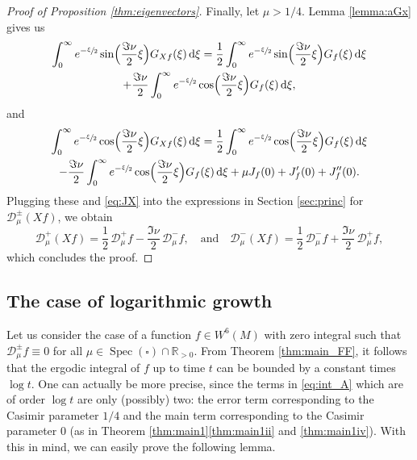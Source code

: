 \documentclass[10pt]{amsart}
\newcommand \R{\mathbb{R}}
\newcommand*{\diff}{\mathop{}\!\mathrm{d}}
\newcommand{\Dp}[1]{\mathcal{D}_\mu^{+} #1}
\newcommand{\Dm}[1]{\mathcal{D}_\mu^{-} #1}
\newcommand{\Dpm}[1]{\mathcal{D}_\mu^{\pm} #1}
\newcommand{\Dpmp}[1]{\mathcal{D}_\mu^{\pm}(#1)}
\DeclareMathOperator{\Spec}{Spec}
\theoremstyle{definition}
\begin{document}
\begin{proof}[{Proof of Proposition \ref{thm:eigenvectors}}]
Finally, let $\mu > 1/4$. Lemma \ref{lemma:aGx} gives us
\begin{multline*}
\int_0^\infty e^{-\sfrac{\xi}{2}} \sin\Bigl(\frac{\Im\nu}{2}\xi \Bigr) G_{Xf}(\xi) \diff \xi = \frac{1}{2} \int_0^\infty e^{-\sfrac{\xi}{2}} \sin\Bigl(\frac{\Im\nu}{2}\xi \Bigr) G_{f}(\xi) \diff \xi \\
+ \frac{\Im\nu}{2}\int_0^\infty e^{-\sfrac{\xi}{2}} \cos\Bigl(\frac{\Im\nu}{2}\xi \Bigr) G_{f}(\xi) \diff \xi,
\end{multline*}
and
\begin{multline*}
\int_0^\infty e^{-\sfrac{\xi}{2}} \cos\Bigl(\frac{\Im\nu}{2}\xi \Bigr) G_{Xf}(\xi) \diff \xi = \frac{1}{2} \int_0^\infty e^{-\sfrac{\xi}{2}} \cos\Bigl(\frac{\Im\nu}{2}\xi \Bigr) G_{f}(\xi) \diff \xi \\
 - \frac{\Im \nu}{2}\int_0^\infty e^{-\sfrac{\xi}{2}} \cos\Bigl(\frac{\Im\nu}{2}\xi \Bigr) G_{f}(\xi) \diff \xi + \mu J_f(0) + J_f'(0)+ J_f''(0).
\end{multline*}
Plugging these and \eqref{eq:JX} into the expressions in Section \ref{sec:princ} for $\Dpmp{Xf}$, we obtain
\[
\Dp{(Xf)}= \frac{1}{2}\, \Dp{f} - \frac{\Im\nu}{2}\, \Dm{f}, \quad\text{and}\quad \Dm{(Xf)}= \frac{1}{2}\, \Dm{f} + \frac{\Im\nu}{2}\, \Dp{f},
\]
which concludes the proof.
\end{proof}

\subsection{The case of logarithmic growth}\label{sec:log_growth}

Let us consider the case of a function $f \in W^6(M)$ with zero integral such that $\Dpm{f} \equiv 0$ for all $\mu \in \Spec(\square) \cap \R_{>0}$.
From Theorem \ref{thm:main_FF}, it follows that the ergodic integral of $f$ up to time $t$ can be bounded by a constant times $\log t$.
One can actually be more precise, since the terms in \eqref{eq:int_A} which are of order $\log t$ are only (possibly) two: the error term corresponding to the Casimir parameter $1/4$ and the main term corresponding to the Casimir parameter 0 (as in Theorem \ref{thm:main1}\eqref{thm:main1ii} and \eqref{thm:main1iv}). With this in mind, we can easily prove the following lemma.
\end{document}

